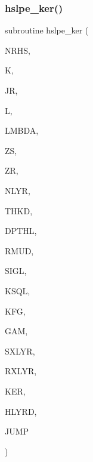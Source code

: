 \subsubsection{\texorpdfstring{hslpe\+\_\+ker()}{hslpe\_ker()}}
{\footnotesize\ttfamily subroutine hslpe\+\_\+ker (\begin{DoxyParamCaption}\item[{integer}]{N\+R\+HS,  }\item[{integer}]{K,  }\item[{integer}]{JR,  }\item[{integer}]{L,  }\item[{real(kind=ql)}]{L\+M\+B\+DA,  }\item[{real(kind=ql)}]{ZS,  }\item[{real(kind=ql)}]{ZR,  }\item[{integer}]{N\+L\+YR,  }\item[{real(kind=ql), dimension (nlyr)}]{T\+H\+KD,  }\item[{real(kind=ql), dimension (nlyr)}]{D\+P\+T\+HL,  }\item[{real(kind=ql), dimension(0\+:nlyr)}]{R\+M\+UD,  }\item[{complex(kind=ql), dimension (nlyr)}]{S\+I\+GL,  }\item[{complex(kind=ql), dimension (nlyr)}]{K\+S\+QL,  }\item[{integer}]{K\+FG,  }\item[{integer}]{G\+AM,  }\item[{integer}]{S\+X\+L\+YR,  }\item[{integer}]{R\+X\+L\+YR,  }\item[{complex(kind=ql), dimension(jnlo-\/nrhs\+:jnhi,3)}]{K\+ER,  }\item[{complex(kind=ql), dimension(nrhs,3)}]{H\+L\+Y\+RD,  }\item[{logical}]{J\+U\+MP }\end{DoxyParamCaption})}

